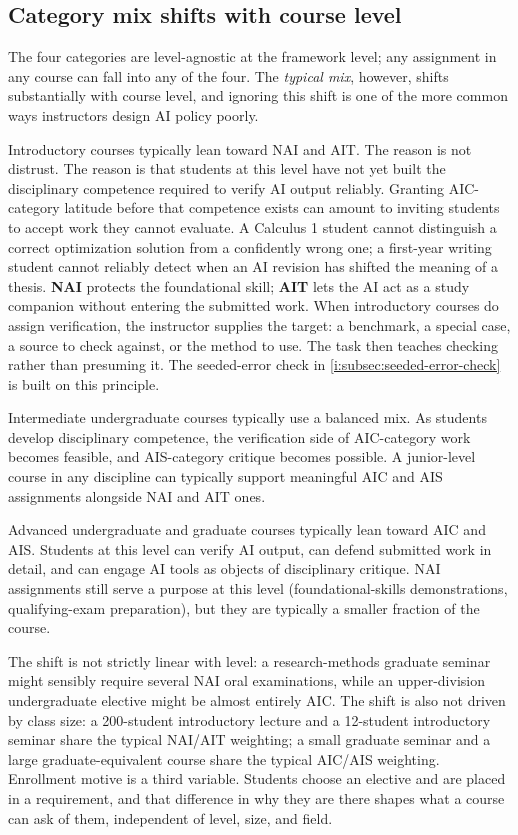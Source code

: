 \documentclass{SIAMbook2023}
\newcommand{\NAI}{\textcolor{catNAI}{\textbf{NAI}}}
\newcommand{\AIT}{\textcolor{catAIT}{\textbf{AIT}}}
\begin{document}
\subsection{Category mix shifts with course level}
\label{i:subsec:category-by-level}

The four categories are level-agnostic at the framework level; any assignment in any course can fall into any of the four. The \emph{typical mix}, however, shifts substantially with course level, and ignoring this shift is one of the more common ways instructors design AI policy poorly.

Introductory courses typically lean toward NAI and AIT. The reason is not distrust. The reason is that students at this level have not yet built the disciplinary competence required to verify AI output reliably. Granting AIC-category latitude before that competence exists can amount to inviting students to accept work they cannot evaluate. A Calculus 1 student cannot distinguish a correct optimization solution from a confidently wrong one; a first-year writing student cannot reliably detect when an AI revision has shifted the meaning of a thesis. \NAI{} protects the foundational skill; \AIT{} lets the AI act as a study companion without entering the submitted work. When introductory courses do assign verification, the instructor supplies the target: a benchmark, a special case, a source to check against, or the method to use. The task then teaches checking rather than presuming it. The seeded-error check in \cref{i:subsec:seeded-error-check} is built on this principle.

Intermediate undergraduate courses typically use a balanced mix. As students develop disciplinary competence, the verification side of AIC-category work becomes feasible, and AIS-category critique becomes possible. A junior-level course in any discipline can typically support meaningful AIC and AIS assignments alongside NAI and AIT ones.

Advanced undergraduate and graduate courses typically lean toward AIC and AIS. Students at this level can verify AI output, can defend submitted work in detail, and can engage AI tools as objects of disciplinary critique. NAI assignments still serve a purpose at this level (foundational-skills demonstrations, qualifying-exam preparation), but they are typically a smaller fraction of the course.

The shift is not strictly linear with level: a research-methods graduate seminar might sensibly require several NAI oral examinations, while an upper-division undergraduate elective might be almost entirely AIC. The shift is also not driven by class size: a 200-student introductory lecture and a 12-student introductory seminar share the typical NAI/AIT weighting; a small graduate seminar and a large graduate-equivalent course share the typical AIC/AIS weighting. Enrollment motive is a third variable. Students choose an elective and are placed in a requirement, and that difference in why they are there shapes what a course can ask of them, independent of level, size, and field.
\end{document}
